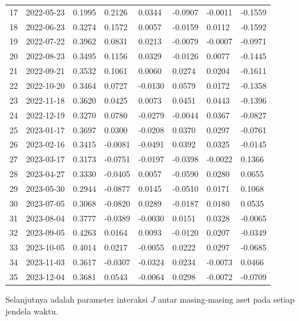 \begin{footnotesize}
\begin{longtable}{llllllll}
17 & 2022-05-23 & 0.1995 & 0.2126 & 0.0344 & -0.0907 & -0.0011 & -0.1559 \\
18 & 2022-06-23 & 0.3274 & 0.1572 & 0.0057 & -0.0159 & 0.0112 & -0.1592 \\
19 & 2022-07-22 & 0.3962 & 0.0831 & 0.0213 & -0.0079 & -0.0007 & -0.0971 \\
20 & 2022-08-23 & 0.3495 & 0.1156 & 0.0329 & -0.0126 & 0.0077 & -0.1445 \\
21 & 2022-09-21 & 0.3532 & 0.1061 & 0.0060 & 0.0274 & 0.0204 & -0.1611 \\
22 & 2022-10-20 & 0.3464 & 0.0727 & -0.0130 & 0.0579 & 0.0172 & -0.1358 \\
23 & 2022-11-18 & 0.3620 & 0.0425 & 0.0073 & 0.0451 & 0.0443 & -0.1396 \\
24 & 2022-12-19 & 0.3270 & 0.0780 & -0.0279 & -0.0044 & 0.0367 & -0.0827 \\
25 & 2023-01-17 & 0.3697 & 0.0300 & -0.0208 & 0.0370 & 0.0297 & -0.0761 \\
26 & 2023-02-16 & 0.3415 & -0.0081 & -0.0491 & 0.0392 & 0.0325 & -0.0145 \\
27 & 2023-03-17 & 0.3173 & -0.0751 & -0.0197 & -0.0398 & -0.0022 & 0.1366 \\
28 & 2023-04-27 & 0.3330 & -0.0405 & 0.0057 & -0.0590 & 0.0280 & 0.0655 \\
29 & 2023-05-30 & 0.2944 & -0.0877 & 0.0145 & -0.0510 & 0.0171 & 0.1068 \\
30 & 2023-07-05 & 0.3068 & -0.0820 & 0.0289 & -0.0187 & 0.0180 & 0.0535 \\
31 & 2023-08-04 & 0.3777 & -0.0389 & -0.0030 & 0.0151 & 0.0328 & -0.0065 \\
32 & 2023-09-05 & 0.4263 & 0.0164 & 0.0093 & -0.0120 & 0.0207 & -0.0349 \\
33 & 2023-10-05 & 0.4014 & 0.0217 & -0.0055 & 0.0222 & 0.0297 & -0.0685 \\
34 & 2023-11-03 & 0.3617 & -0.0307 & -0.0324 & 0.0234 & -0.0073 & 0.0466 \\
35 & 2023-12-04 & 0.3681 & 0.0543 & -0.0064 & 0.0298 & -0.0072 & -0.0709 \\
\end{longtable}
\end{footnotesize}

Selanjutnya adalah parameter interaksi $J$ antar masing-masing aset pada setiap jendela waktu.

